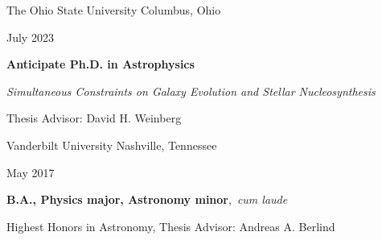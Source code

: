 \documentclass[cv.tex]{subfiles}
\begin{document}
{\color{themecolor}\large The Ohio State University}
\hfill
Columbus, Ohio
\par\noindent
\parbox{0.18\textwidth}{%
	\raggedleft
	July 2023 \par
	\null \par
	\null
}
\hspace{1mm}
\parbox{0.8\textwidth}{%
	\textbf{Anticipate Ph.D. in Astrophysics} \par
	\textit{Simultaneous Constraints on Galaxy Evolution and Stellar
	Nucleosynthesis} \par
	Thesis Advisor: David H. Weinberg \par
}
\vspace{2mm}
\par\noindent
{\color{themecolor}\large Vanderbilt University}
\hfill
Nashville, Tennessee
\par\noindent
\parbox{0.18\textwidth}{%
	\raggedleft
	May 2017 \par
	\null
}
\hspace{1mm}
\parbox{0.8\textwidth}{%
	\vspace{1mm}
	\textbf{B.A., Physics major, Astronomy minor},~\textit{cum laude} \par
	Highest Honors in Astronomy, Thesis Advisor: Andreas A. Berlind
}
\end{document}
